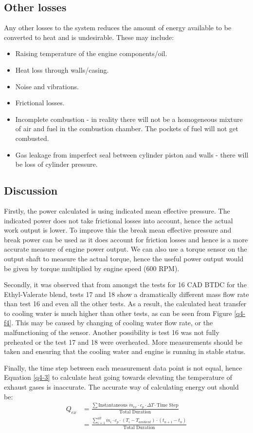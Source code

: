 \subsection*{Other losses}
Any other losses to the system reduces the amount of energy available to be converted to heat and is undesirable. These may include:
\begin{itemize}
    \item Raising temperature of the engine components/oil.
    \item Heat loss through walls/casing.
    \item Noise and vibrations.
    \item Frictional losses.
    \item Incomplete combustion - in reality there will not be a homogeneous mixture of air and fuel in the combustion chamber. The pockets of fuel will not get combusted.
    \item Gas leakage from imperfect seal between cylinder piston and walls - there will be loss of cylinder pressure.
\end{itemize}
\subsection*{Discussion}
Firstly, the power calculated is using indicated mean effective pressure. The indicated power does not take frictional losses into account, hence the actual work output is lower. To improve this the break mean effective pressure and break power can be used as it does account for friction losses and hence is a more accurate measure of engine power output. We can also use a torque sensor on the output shaft to measure the actual torque, hence the useful power output would be given by torque multiplied by engine speed (600 RPM).

Secondly, it was observed that from amongst the tests for 16 CAD BTDC for the  Ethyl-Valerate blend, tests 17 and 18 show a dramatically different mass flow rate than test 16 and even all the other tests. As a result, the calculated heat transfer to cooling water is much higher than other tests, as can be seen from Figure \ref{q4-f4}. This may be caused by changing of cooling water flow rate, or the malfunctioning of the sensor. Another possibility is test 16 was not fully preheated or the test 17 and 18 were overheated. More measurements should be taken and ensuring that the cooling water and engine is running in stable status.

Finally, the time step between each measurement data point is not equal, hence Equation \ref{q4-3} to calculate heat going towards elevating the temperature of exhaust gases is inaccurate. The accurate way of calculating energy out should be:
\begin{align*}
    Q_{ex} & = \frac{\sum \textrm{Instantaneous } \dot{m}_{ex} \cdot c_p \cdot \Delta T \cdot \textrm{Time Step}}{\textrm{Total Duration}} \\
           & = \frac{\sum \limits_{i=1}^{all} \dot{m}_{i} \cdot c_p \cdot (T_i-T_{ambient}) \cdot (t_{n+1}-t_n)}{\textrm{Total Duration}}
\end{align*}
